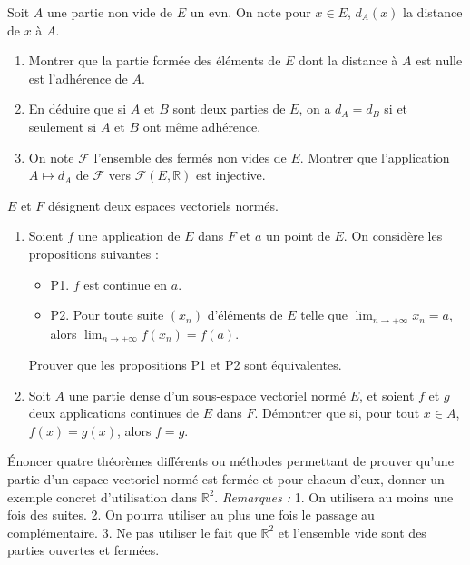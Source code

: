 \begin{exercice}
Soit $A$ une partie non vide de $E$ un evn. On note pour $x \in E$, $d_{A}(x)$ la distance de $x$ à $A$.
\begin{enumerate}
    \item Montrer que la partie formée des éléments de $E$ dont la distance à $A$ est nulle est l'adhérence de $A$.
    \item En déduire que si $A$ et $B$ sont deux parties de $E$, on a $d_{A} = d_{B}$ si et seulement si $A$ et $B$ ont même adhérence.
    \item On note $\mathcal{F}$ l'ensemble des fermés non vides de $E$. Montrer que l'application $A \mapsto d_{A}$ de $\mathcal{F}$ vers $\mathcal{F}(E, \mathbb{R})$ est injective.
\end{enumerate}
\end{exercice}

\begin{exercice}
$E$ et $F$ désignent deux espaces vectoriels normés.
\begin{enumerate}
    \item Soient $f$ une application de $E$ dans $F$ et $a$ un point de $E$. On considère les propositions suivantes :
    \begin{itemize}
        \item P1. $f$ est continue en $a$.
        \item P2. Pour toute suite $(x_{n})$ d'éléments de $E$ telle que $\lim_{n \rightarrow +\infty} x_{n} = a$, alors $\lim_{n \rightarrow +\infty} f(x_{n}) = f(a)$.
    \end{itemize}
    Prouver que les propositions P1 et P2 sont équivalentes.
    \item Soit $A$ une partie dense d'un sous-espace vectoriel normé $E$, et soient $f$ et $g$ deux applications continues de $E$ dans $F$. Démontrer que si, pour tout $x \in A$, $f(x)=g(x)$, alors $f=g$.
\end{enumerate}
\end{exercice}

\begin{exercice}
Énoncer quatre théorèmes différents ou méthodes permettant de prouver qu'une partie d'un espace vectoriel normé est fermée et pour chacun d'eux, donner un exemple concret d'utilisation dans $\mathbb{R}^{2}$.
\textit{Remarques :}
1. On utilisera au moins une fois des suites.
2. On pourra utiliser au plus une fois le passage au complémentaire.
3. Ne pas utiliser le fait que $\mathbb{R}^{2}$ et l'ensemble vide sont des parties ouvertes et fermées.
\end{exercice}

